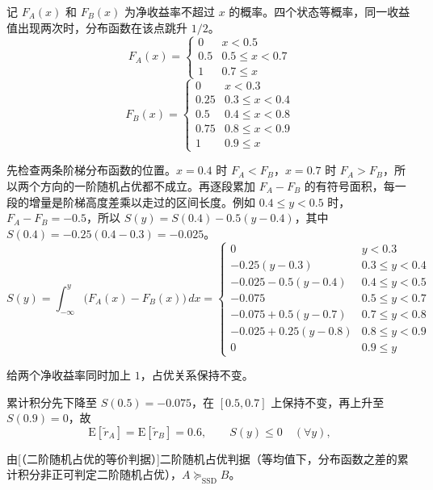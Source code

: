 \begin{solution}[blank-type=manual,blank-vsep=8\baselineskip]
记 $F_A(x)$ 和 $F_B(x)$ 为净收益率不超过 $x$ 的概率。四个状态等概率，同一收益值出现两次时，分布函数在该点跳升 $1/2$。
\[
    F_{A}(x)=\begin{cases}
        0 & x<0.5\\
        0.5 & 0.5\le x<0.7\\
        1 & 0.7\le x
    \end{cases}
\]
\[
    F_{B}(x)=\begin{cases}
        0 & x<0.3\\
        0.25 & 0.3\le x<0.4\\
        0.5 & 0.4\le x<0.8\\
        0.75 & 0.8\le x<0.9\\
        1 & 0.9\le x
    \end{cases}
\]

先检查两条阶梯分布函数的位置。$x=0.4$ 时 $F_A<F_B$，$x=0.7$ 时 $F_A>F_B$，所以两个方向的一阶随机占优都不成立。再逐段累加 $F_A-F_B$ 的有符号面积，每一段的增量是阶梯高度差乘以走过的区间长度。例如 $0.4\le y<0.5$ 时，$F_A-F_B=-0.5$，所以 $S(y)=S(0.4)-0.5(y-0.4)$，其中 $S(0.4)=-0.25(0.4-0.3)=-0.025$。
\[
    S(y)=\int_{-\infty}^{y}\bigl(F_{A}(x)-F_{B}(x)\bigr)\,dx=\begin{cases}
        0 & y<0.3\\
        -0.25(y-0.3) & 0.3\le y<0.4\\
        -0.025-0.5(y-0.4) & 0.4\le y<0.5\\
        -0.075 & 0.5\le y<0.7\\
        -0.075+0.5(y-0.7) & 0.7\le y<0.8\\
        -0.025+0.25(y-0.8) & 0.8\le y<0.9\\
        0 & 0.9\le y
    \end{cases}
\]

给两个净收益率同时加上 $1$，占优关系保持不变。

累计积分先下降至 $S(0.5)=-0.075$，在 $[0.5,0.7]$ 上保持不变，再上升至 $S(0.9)=0$，故
\[
 \mathrm E[\tilde r_A]=\mathrm E[\tilde r_B]=0.6,\qquad S(y)\le0\quad(\forall y),
\]

由\ifdefined\WJHandoutKnowledge {}[（二阶随机占优的等价判据）]\else 二阶随机占优判据\fi（等均值下，分布函数之差的累计积分非正可判定二阶随机占优），$A\succeq_{\mathrm{SSD}}B$。
\end{solution}


